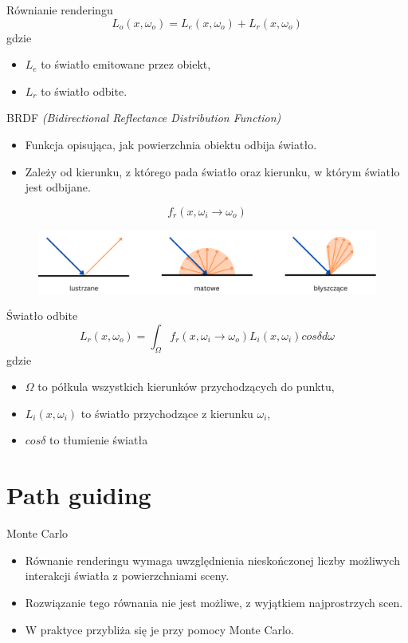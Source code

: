 \documentclass{beamer}
\begin{document}
\begin{frame}{Równianie renderingu}
$$ L_o(x, \omega_o) = L_e(x, \omega_o) + L_r(x, \omega_o) $$
gdzie
\begin{itemize}
    \item $L_e$ to światło emitowane przez obiekt,
    \item $L_r$ to światło odbite.
\end{itemize}
\end{frame}

\begin{frame}{BRDF \it{(Bidirectional Reflectance Distribution Function)}}
    \begin{itemize}
        \item Funkcja opisująca, jak powierzchnia obiektu odbija światło.
        \item Zależy od kierunku, z którego pada światło oraz kierunku, w którym światło jest odbijane.
    \end{itemize}
$$ f_r(x, \omega_i \rightarrow \omega_o) $$
\begin{figure}
    \centering
    \includegraphics[width=1\linewidth]{img/surfaces.png}
    \label{fig:enter-label}
\end{figure}
\end{frame}

\begin{frame}{Światło odbite}
    $$ L_r(x, \omega_o) = \int_{\Omega}f_r(x, \omega_i \rightarrow \omega_o)L_i(x, \omega_i)cos\delta d\omega $$
gdzie
\begin{itemize}
    \item $\Omega$ to półkula wszystkich kierunków przychodzących do punktu,
    \item $L_i(x, \omega_i)$ to światło przychodzące z kierunku $\omega_i$,
    \item $cos\delta$ to tłumienie światła
\end{itemize}
\end{frame}

\section{Path guiding}

\begin{frame}{Monte Carlo}
    \begin{itemize}
        \item Równanie renderingu wymaga uwzględnienia nieskończonej liczby możliwych interakcji światła z powierzchniami sceny.
        \item Rozwiązanie tego równania nie jest możliwe, z wyjątkiem najprostrzych scen.
        \item W praktyce przybliża się je przy pomocy Monte Carlo.
    \end{itemize}
\end{frame}
\end{document}
